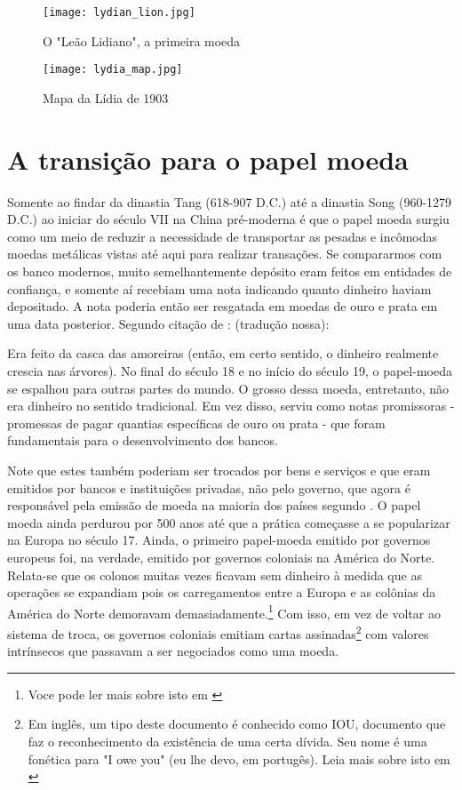 \begin{figure}[H]\label{lydian1}
	\centering
	\caption{O "Leão Lidiano", a primeira moeda}
	\texttt{[image: lydian\_lion.jpg]} 
	\\
\end{figure}
\begin{figure}[H]\label{lydian2}
	\centering 
	\caption{Mapa da Lídia de 1903}
	\texttt{[image: lydia\_map.jpg]}\\
\end{figure} 

\section{A transição para o papel moeda}

Somente ao findar da dinastia Tang (618-907 D.C.) até a dinastia Song (960-1279 D.C.) ao iniciar do século VII na China pré-moderna é que o papel moeda surgiu como um meio de reduzir a necessidade de transportar as pesadas e incômodas moedas metálicas vistas até aqui para realizar transações. Se compararmos com os banco modernos, muito semelhantemente  depósito eram feitos em entidades de confiança, e somente aí recebiam uma nota indicando quanto dinheiro haviam depositado. A nota poderia então ser resgatada em moedas de ouro e prata em uma data posterior. Segundo citação de \cite{BRIT}: (tradução nossa):

\begin{citacao}
	Era feito da casca das amoreiras (então, em certo sentido, o dinheiro realmente crescia nas árvores). No final do século 18 e no início do século 19, o papel-moeda se espalhou para outras partes do mundo. O grosso dessa moeda, entretanto, não era dinheiro no sentido tradicional. Em vez disso, serviu como notas promissoras - promessas de pagar quantias específicas de ouro ou prata - que foram fundamentais para o desenvolvimento dos bancos.
	\end{citacao}

Note que estes também poderiam ser trocados por bens e serviços e que eram emitidos por bancos e instituições privadas, não pelo governo, que agora é responsável pela emissão de moeda na maioria dos países segundo \cite{BRIT2}. O papel moeda ainda perdurou por 500 anos até que a prática começasse a se popularizar na Europa no século 17. Ainda, o primeiro papel-moeda emitido por governos europeus foi, na verdade, emitido por governos coloniais na América do Norte. Relata-se que os colonos muitas vezes ficavam sem dinheiro à medida que as operações se expandiam pois os carregamentos entre a Europa e as colônias da América do Norte demoravam demasiadamente.\footnote{Voce pode ler mais sobre isto em \cite{TEXAS}} Com isso, em vez de voltar ao sistema de troca, os governos coloniais emitiam cartas assinadas\footnote{Em inglês, um tipo deste documento é conhecido como IOU, documento que faz o reconhecimento da existência de uma certa dívida. Seu nome é uma fonética para "I owe you" (eu lhe devo, em portugês). Leia mais sobre isto em \cite{KENTON}} com valores intrínsecos que passavam a ser negociados como uma moeda.

